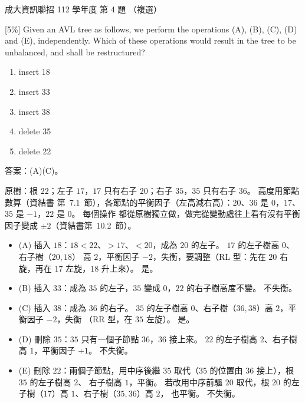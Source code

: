 \begin{pastexam}[label={px:ncku-112-prog-04}]{成大資訊聯招 112 學年度 第 4 題}
（複選）

{[5\%]} Given an AVL tree as follows, we perform the operations (A), (B), (C), (D) and (E),
independently. Which of these operations would result in the tree to be unbalanced, and shall be
restructured?

\begin{center}
\end{center}
\begin{enumerate}[label=(\Alph*)]
\item insert 18
\item insert 33
\item insert 38
\item delete 35
\item delete 22
\end{enumerate}
\end{pastexam}

\begin{pastsoln}
答案：(A)(C)。

原樹：根 $22$；左子 $17$，$17$ 只有右子 $20$；右子 $35$，$35$ 只有右子 $36$。 高度用節點數算（資結書
第~7.1~節），各節點的平衡因子（左高減右高）：$20$、$36$ 是 $0$，$17$、$35$ 是 $-1$，$22$ 是 $0$。 每個操作
都從原樹獨立做，做完從變動處往上看有沒有平衡因子變成 $\pm 2$（資結書第~10.2~節）。

\begin{itemize}
\item (A) 插入 $18$：$18 < 22$、$> 17$、$< 20$，成為 $20$ 的左子。 $17$ 的左子樹高 $0$、右子樹（$20, 18$）
高 $2$，平衡因子 $-2$，失衡，要調整（RL 型：先在 $20$ 右旋，再在 $17$ 左旋，$18$ 升上來）。 是。
\item (B) 插入 $33$：成為 $35$ 的左子，$35$ 變成 $0$，$22$ 的右子樹高度不變。 不失衡。
\item (C) 插入 $38$：成為 $36$ 的右子。 $35$ 的左子樹高 $0$、右子樹（$36, 38$）高 $2$，平衡因子 $-2$，失衡
（RR 型，在 $35$ 左旋）。 是。
\item (D) 刪除 $35$：$35$ 只有一個子節點 $36$，$36$ 接上來。 $22$ 的左子樹高 $2$、右子樹高 $1$，平衡因子
$+1$。 不失衡。
\item (E) 刪除 $22$：兩個子節點，用中序後繼 $35$ 取代（$35$ 的位置由 $36$ 接上），根 $35$ 的左子樹高 $2$、
右子樹高 $1$，平衡。 若改用中序前驅 $20$ 取代，根 $20$ 的左子樹（$17$）高 $1$、右子樹（$35, 36$）高 $2$，
也平衡。 不失衡。
\end{itemize}
\end{pastsoln}
